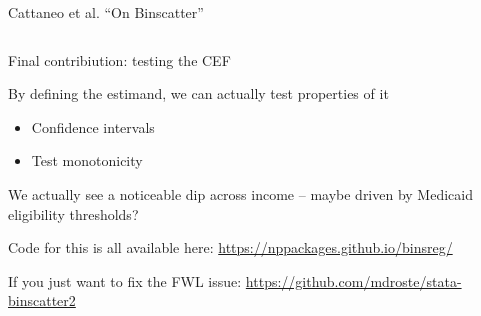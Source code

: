 \documentclass[notes,11pt, aspectratio=169]{beamer}
\newenvironment{wideitemize}{\itemize\addtolength{\itemsep}{10pt}}{\enditemize}
\begin{document}
\begin{frame}{Cattaneo et al. ``On Binscatter''}
  \begin{columns}[T] %
    \begin{column}{.5\textwidth}
      \begin{wideitemize}
      \item Final contribiution: testing the CEF
      \item By defining the estimand, we can actually test properties
        of it
        \begin{itemize}
        \item Confidence intervals
        \item Test monotonicity
        \end{itemize}
      \item We actually see a noticeable dip across income -- maybe
        driven by Medicaid eligibility thresholds?
      \item Code for this is all available here: \url{https://nppackages.github.io/binsreg/}
      \item If you just want to fix the FWL issue: \url{https://github.com/mdroste/stata-binscatter2}
  \end{wideitemize}
  \end{column}%
  \hfill%
  \begin{column}{.5\textwidth}
  \end{column}
\end{columns}
\end{frame}
\end{document}
